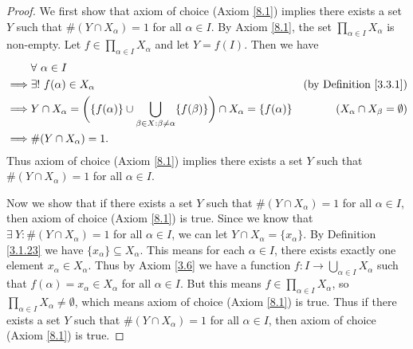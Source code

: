 \begin{proof}
    We first show that axiom of choice (Axiom \ref{8.1}) implies there exists a set \(Y\) such that \(\#(Y \cap X_{\alpha}) = 1\) for all \(\alpha \in I\).
    By Axiom \ref{8.1}, the set \(\prod_{\alpha \in I} X_{\alpha}\) is non-empty.
    Let \(f \in \prod_{\alpha \in I} X_{\alpha}\) and let \(Y = f(I)\).
    Then we have
    \begin{align*}
        & \forall\ \alpha \in I \\
        \implies & \exists!\ f(\alpha) \in X_{\alpha} & \text{(by Definition \ref{3.3.1})} \\
        \implies & Y \cap X_{\alpha} = \bigg(\{f(\alpha)\} \cup \bigcup_{\beta \in X : \beta \neq \alpha} \{f(\beta)\}\bigg) \cap X_\alpha = \{f(\alpha)\} & (X_{\alpha} \cap X_{\beta} = \emptyset) \\
        \implies & \#(Y \cap X_{\alpha}) = 1.
    \end{align*}
    Thus axiom of choice (Axiom \ref{8.1}) implies there exists a set \(Y\) such that \(\#(Y \cap X_{\alpha}) = 1\) for all \(\alpha \in I\).

    Now we show that if there exists a set \(Y\) such that \(\#(Y \cap X_{\alpha}) = 1\) for all \(\alpha \in I\), then axiom of choice (Axiom \ref{8.1}) is true.
    Since we know that \(\exists\ Y : \#(Y \cap X_{\alpha}) = 1\) for all \(\alpha \in I\), we can let \(Y \cap X_{\alpha} = \{x_{\alpha}\}\).
    By Definition \ref{3.1.23} we have \(\{x_\alpha\} \subseteq X_{\alpha}\).
    This means for each \(\alpha \in I\), there exists exactly one element \(x_{\alpha} \in X_{\alpha}\).
    Thus by Axiom \ref{3.6} we have a function \(f : I \to \bigcup_{\alpha \in I} X_{\alpha}\) such that \(f(\alpha) = x_{\alpha} \in X_{\alpha}\) for all \(\alpha \in I\).
    But this means \(f \in \prod_{\alpha \in I} X_{\alpha}\), so \(\prod_{\alpha \in I} X_{\alpha} \neq \emptyset\), which means axiom of choice (Axiom \ref{8.1}) is true.
    Thus if there exists a set \(Y\) such that \(\#(Y \cap X_{\alpha}) = 1\) for all \(\alpha \in I\), then axiom of choice (Axiom \ref{8.1}) is true.
\end{proof}